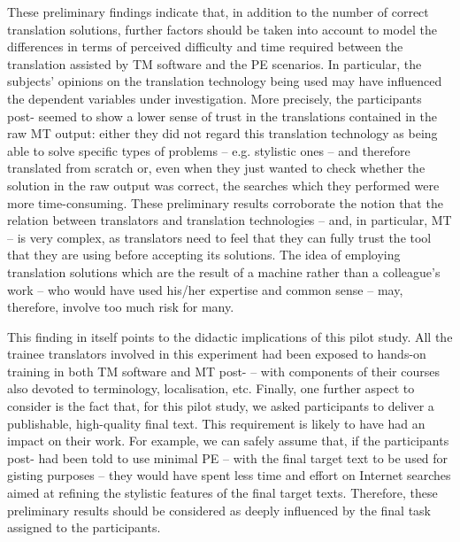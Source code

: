 \documentclass[output=paper]{LSP/langsci}
\begin{document}
These preliminary findings indicate that, in addition to the number of correct translation solutions, further factors should be taken into account to model the differences in terms of perceived difficulty and time required between the translation assisted by TM software and the PE scenarios. In particular, the subjects' opinions on the translation technology being used may have influenced the dependent variables under investigation. More precisely, the participants post- seemed to show a lower sense of trust in the translations contained in the raw MT output: either they did not regard this translation technology as being able to solve specific types of problems -- e.g. stylistic ones -- and therefore translated from scratch or, even when they just wanted to check whether the solution in the raw output was correct, the searches which they performed were more time-consuming. These preliminary results corroborate the notion that the relation between translators and translation technologies -- and, in particular, MT -- is very complex, as translators need to feel that they can fully trust the tool that they are using before accepting its solutions. The idea of employing translation solutions which are the result of a machine rather than a colleague's work -- who would have used his/her expertise and common sense -- may, therefore, involve too much risk for many.


 
This finding in itself points to the didactic implications of this pilot study. All the trainee translators involved in this experiment had been exposed to hands-on training in both TM software and MT post- -- with components of their courses also devoted to terminology, localisation, etc. Finally, one further aspect to consider is the fact that, for this pilot study, we asked participants to deliver a publishable, high-quality final text. This requirement is likely to have had an impact on their work. For example, we can safely assume that, if the participants post- had been told to use minimal PE -- with the final target text to be used for gisting purposes -- they would have spent less time and effort on Internet searches aimed at refining the stylistic features of the final target texts. Therefore, these preliminary results should be considered as deeply influenced by the final task assigned to the participants.
\end{document}
